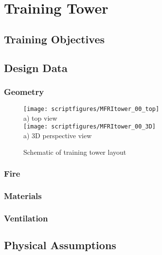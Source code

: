 \chapter{Training Tower}

\section{Training Objectives}

\section{Design Data}
\subsection{Geometry}


\begin{figure}[\figoptions]
\begin{center}
\texttt{[image: scriptfigures/MFRItower\_00\_top]}\\
a) top view\\
\texttt{[image: scriptfigures/MFRItower\_00\_3D]}\\
a) 3D perspective view\\
\end{center}
\caption {Schematic of training tower layout}
\label{figflashoverplan}%
\end{figure}
\subsection{Fire}

\subsection{Materials}

\subsection{Ventilation}

\section{Physical Assumptions}
